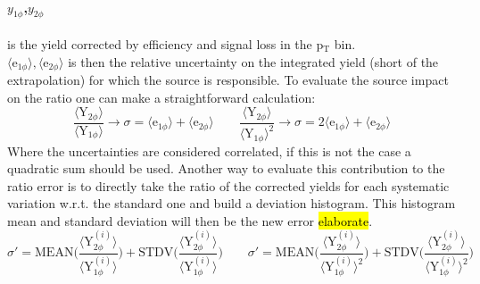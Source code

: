 \paragraph{$y_{1\phi}$,$y_{2\phi}$} is the yield corrected by efficiency and signal loss in the p$_{\text{T}}$ bin.\\
$\langle \text{e}_{1\phi}\rangle, \langle \text{e}_{2\phi}\rangle$ is then the relative uncertainty on the integrated yield (short of the extrapolation) for which the source is responsible. To evaluate the source impact on the ratio one can make a straightforward calculation:
\begin{equation}
\frac{\langle \text{Y}_{2\phi} \rangle}{\langle \text{Y}_{1\phi} \rangle} \to \sigma = \langle \text{e}_{1\phi}\rangle + \langle \text{e}_{2\phi}\rangle \qquad \frac{\langle \text{Y}_{2\phi} \rangle}{\langle \text{Y}_{1\phi} \rangle^{2}} \to \sigma = 2\langle \text{e}_{1\phi}\rangle + \langle \text{e}_{2\phi}\rangle 
\label{}
\end{equation}
Where the uncertainties are considered correlated, if this is not the case a quadratic sum should be used. Another way to evaluate this contribution to the ratio error is to directly take the ratio of the corrected yields for each systematic variation w.r.t. the standard one and build a deviation histogram. This histogram mean and standard deviation will then be the new error \hl{elaborate}.
\begin{equation}
\sigma' = \text{MEAN}\Big( \frac{\langle \text{Y}_{2\phi}^{(i)} \rangle}{\langle \text{Y}_{1\phi}^{(i)} \rangle} \Big) + \text{STDV}\Big( \frac{\langle \text{Y}_{2\phi}^{(i)} \rangle}{\langle \text{Y}_{1\phi}^{(i)} \rangle} \Big) \qquad \sigma' = \text{MEAN}\Big( \frac{\langle \text{Y}_{2\phi}^{(i)} \rangle}{\langle \text{Y}_{1\phi}^{(i)} \rangle^{2}} \Big) + \text{STDV}\Big( \frac{\langle \text{Y}_{2\phi}^{(i)} \rangle}{\langle \text{Y}_{1\phi}^{(i)} \rangle^{2}} \Big)
\label{}
\end{equation}

\newpage
